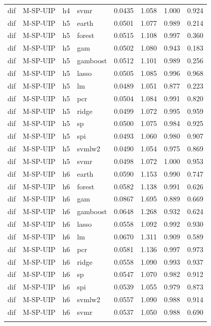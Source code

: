 \begin{ThreePartTable}
\begin{longtable}[t]{llclcccc}
dif & M-SP-UIP & h4 & svmr & 0.0435 & 1.058 & 1.000 & 0.924\\
\addlinespace
dif & M-SP-UIP & h5 & earth & 0.0501 & 1.077 & 0.989 & 0.214\\
dif & M-SP-UIP & h5 & forest & 0.0515 & 1.108 & 0.997 & 0.360\\
dif & M-SP-UIP & h5 & gam & 0.0502 & 1.080 & 0.943 & 0.183\\
dif & M-SP-UIP & h5 & gamboost & 0.0512 & 1.101 & 0.989 & 0.256\\
dif & M-SP-UIP & h5 & lasso & 0.0505 & 1.085 & 0.996 & 0.968\\
dif & M-SP-UIP & h5 & lm & 0.0489 & 1.051 & 0.877 & 0.223\\
dif & M-SP-UIP & h5 & pcr & 0.0504 & 1.084 & 0.991 & 0.820\\
dif & M-SP-UIP & h5 & ridge & 0.0499 & 1.072 & 0.995 & 0.959\\
dif & M-SP-UIP & h5 & sp & 0.0500 & 1.075 & 0.984 & 0.925\\
dif & M-SP-UIP & h5 & spi & 0.0493 & 1.060 & 0.980 & 0.907\\
dif & M-SP-UIP & h5 & svmlw2 & 0.0490 & 1.054 & 0.975 & 0.869\\
dif & M-SP-UIP & h5 & svmr & 0.0498 & 1.072 & 1.000 & 0.953\\
\addlinespace
dif & M-SP-UIP & h6 & earth & 0.0590 & 1.153 & 0.990 & 0.747\\
dif & M-SP-UIP & h6 & forest & 0.0582 & 1.138 & 0.991 & 0.626\\
dif & M-SP-UIP & h6 & gam & 0.0867 & 1.695 & 0.889 & 0.669\\
dif & M-SP-UIP & h6 & gamboost & 0.0648 & 1.268 & 0.932 & 0.624\\
dif & M-SP-UIP & h6 & lasso & 0.0558 & 1.092 & 0.992 & 0.930\\
dif & M-SP-UIP & h6 & lm & 0.0670 & 1.311 & 0.909 & 0.589\\
dif & M-SP-UIP & h6 & pcr & 0.0581 & 1.136 & 0.997 & 0.973\\
dif & M-SP-UIP & h6 & ridge & 0.0558 & 1.090 & 0.993 & 0.937\\
dif & M-SP-UIP & h6 & sp & 0.0547 & 1.070 & 0.982 & 0.912\\
dif & M-SP-UIP & h6 & spi & 0.0539 & 1.055 & 0.979 & 0.873\\
dif & M-SP-UIP & h6 & svmlw2 & 0.0557 & 1.090 & 0.988 & 0.914\\
dif & M-SP-UIP & h6 & svmr & 0.0537 & 1.050 & 0.988 & 0.690\\
\addlinespace

\end{longtable}
\end{ThreePartTable}
